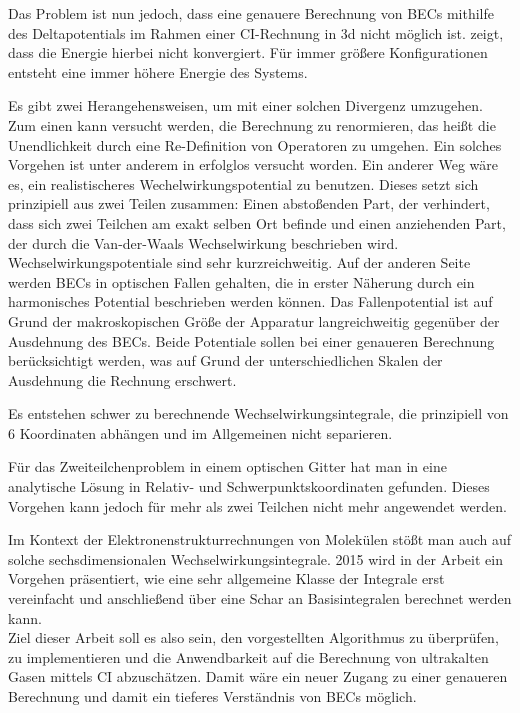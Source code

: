 Das Problem ist nun jedoch, dass eine genauere Berechnung von BECs mithilfe 
des Deltapotentials im Rahmen einer CI-Rechnung in 3d nicht möglich ist. 
\cite{av:1b} zeigt, dass die Energie hierbei nicht konvergiert. Für immer 
größere Konfigurationen entsteht eine immer höhere Energie des Systems.

Es gibt zwei Herangehensweisen, um mit einer solchen Divergenz umzugehen. Zum 
einen kann versucht werden, die Berechnung zu renormieren, das heißt die 
Unendlichkeit durch eine  Re-Definition von Operatoren zu umgehen. Ein solches 
Vorgehen ist unter anderem in \cite{phdthesis:sala} erfolglos versucht worden. 
%
Ein anderer Weg wäre es, ein realistischeres Wechelwirkungspotential zu 
benutzen. Dieses setzt sich prinzipiell aus zwei Teilen 
zusammen: Einen 
abstoßenden Part, der verhindert, dass sich zwei Teilchen am exakt selben Ort 
befinde und einen anziehenden Part, der durch die 
Van-der-Waals 
Wechselwirkung beschrieben wird. Wechselwirkungspotentiale sind sehr 
kurzreichweitig.  Auf der anderen Seite werden BECs in optischen Fallen 
gehalten, die in erster Näherung durch ein harmonisches Potential beschrieben 
werden können. Das Fallenpotential ist auf Grund der makroskopischen Größe der 
Apparatur langreichweitig gegenüber der Ausdehnung des BECs.  Beide Potentiale 
sollen bei einer genaueren Berechnung berücksichtigt werden, 
was auf Grund der 
unterschiedlichen Skalen der Ausdehnung die Rechnung erschwert.

Es entstehen schwer zu berechnende Wechselwirkungsintegrale, 
die prinzipiell von 6 Koordinaten abhängen und im Allgemeinen nicht separieren.

Für das Zweiteilchenproblem in einem optischen Gitter hat man in 
\cite{phdthesis:sergey} eine analytische Lösung in Relativ- und 
Schwerpunktskoordinaten gefunden. Dieses Vorgehen kann jedoch für mehr als zwei 
Teilchen nicht mehr angewendet werden.

Im Kontext der Elektronenstrukturrechnungen von Molekülen stößt man auch auf 
solche sechsdimensionalen Wechselwirkungsintegrale. 2015 wird 
in der Arbeit 
\cite{av:1a} ein Vorgehen präsentiert, wie eine sehr allgemeine Klasse der 
Integrale erst vereinfacht und anschließend über eine Schar 
an Basisintegralen 
berechnet werden kann. \\

Ziel dieser Arbeit soll es also sein, den vorgestellten 
Algorithmus zu 
überprüfen, zu implementieren und die Anwendbarkeit auf die Berechnung von 
ultrakalten Gasen mittels CI abzuschätzen. Damit wäre ein neuer Zugang zu einer 
genaueren Berechnung und damit ein tieferes Verständnis von BECs möglich. \\


